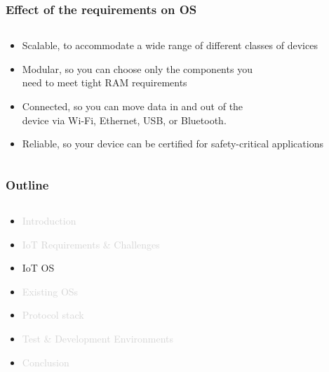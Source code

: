 \documentclass{beamer}
\begin{document}
\begin{frame}
	\frametitle{Effect of the requirements on OS}
	\begin{columns}[c]
		\begin{column}{30cm}
			\vspace{.1cm}
			\begin{itemize}
				\justifying
				\item \textcolor{TextOrange}{Scalable}, to accommodate a wide range of different
				 classes of devices
				\item \textcolor{TextGreen}{Modular}, so you can choose only the components you\\
				need to meet tight RAM requirements
				\item \textcolor{TextOrange}{Connected}, so you can move data in and out of the\\
				device via Wi-Fi, Ethernet, USB, or Bluetooth.
				\item \textcolor{TextGreen}{Reliable}, so your device can be certified for safety-critical
				applications
			\end{itemize}
		\end{column}
	\end{columns}
\end{frame}

\begin{frame}
	\frametitle{Outline}
	\begin{columns}[c]
		\begin{column}{30cm}
			\vspace{.1cm}
			\begin{itemize}
				\justifying
				\item \textcolor{LightGray}{Introduction}
				\item \textcolor{LightGray}{IoT Requirements \& Challenges}
				\item IoT OS
				\item \textcolor{LightGray}{Existing OSs}
				\item \textcolor{LightGray}{Protocol stack}
				\item \textcolor{LightGray}{Test \& Development Environments}
				\item \textcolor{LightGray}{Conclusion}
			\end{itemize}
		\end{column}
	\end{columns}
\end{frame}
\end{document}
